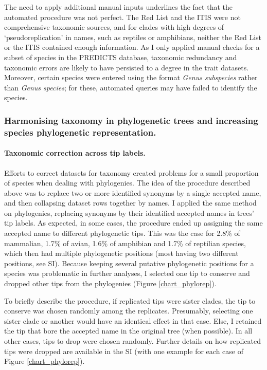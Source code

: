 The need to apply additional manual inputs underlines the fact that the automated procedure was not perfect. The Red List and the ITIS were not comprehensive taxonomic sources, and for clades with high degrees of `pseudoreplication' in names, such as reptiles or amphibians, neither the Red List or the ITIS contained enough information. As I only applied manual checks for a subset of species in the PREDICTS database, taxonomic redundancy and taxonomic errors are likely to have persisted to a degree in the trait datasets. Moreover, certain species were entered using the format \textit{Genus subspecies} rather than \textit{Genus species}; for these, automated queries may have failed to identify the species.



\subsubsection{Harmonising taxonomy in phylogenetic trees and increasing species phylogenetic representation.}

\paragraph{Taxonomic correction across tip labels.} 
Efforts to correct datasets for taxonomy created problems for a small proportion of species when dealing with phylogenies. The idea of the procedure described above was to replace two or more identified synonyms by a single accepted name, and then collapsing dataset rows together by names. I applied the same method on phylogenies, replacing synonyms by their identified accepted names in trees' tip labels. As expected, in some cases, the procedure ended up assigning the same accepted name to different phylogenetic tips. This was the case for 2.8\% of mammalian, 1.7\% of avian, 1.6\% of amphibian and  1.7\% of reptilian species, which then had multiple phylogenetic positions (most having two different positions, see SI). Because keeping several putative phylogenetic positions for a species was problematic in further analyses, I selected one tip to conserve and dropped other tips from the phylogenies (Figure \ref{chart_phylorep}). 

To briefly describe the procedure, if replicated tips were sister clades, the tip to conserve was chosen randomly among the replicates. Presumably, selecting one sister clade or another would have an identical effect in that case. Else, I retained the tip that bore the accepted name in the original tree (when possible). In all other cases, tips to drop were chosen randomly. Further details on how replicated tips were dropped are available in the SI (with one example for each case of Figure \ref{chart_phylorep}).

